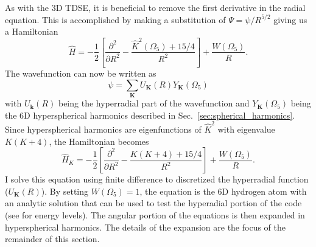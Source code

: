 As with the 3D TDSE, it is beneficial to remove the first derivative in the radial equation. This is accomplished by making a substitution of $\Psi = \psi/R^{5/2}$ giving us a Hamiltonian
\begin{equation}
   \hat{H} = -\frac{1}{2} \left[\frac{\partial^2}{\partial R^2} - \frac{\hat{K}^2(\Omega_5)+15/4}{R^2}\right] + \frac{W(\Omega_5)}{R}.
\end{equation}
The wavefunction can now be written as
\begin{equation}
    \psi = \sum\limits_{\mathbf{K}} U_{\mathbf{K}}(R) Y_{\mathbf{K}}(\Omega_5)
\end{equation}
with $U_{\mathbf{k}}(R)$ being the hyperradial part of the wavefunction and $Y_{\mathbf{K}}(\Omega_5)$ being the 6D hyperspherical harmonics described in Sec.~\ref{sec:spherical_harmonics}. Since hyperspherical harmonics are eigenfunctions of $\hat{K}^2$ with eigenvalue $K(K+4)$, the Hamiltonian becomes
\begin{equation}
   \hat{H}_{K} = -\frac{1}{2} \left[\frac{\partial^2}{\partial R^2} - \frac{K(K+4)+15/4}{R^2}\right] + \frac{W(\Omega_5)}{R}.
\end{equation}
I solve this equation using finite difference to discretized the hyperradial function ($U_{\mathbf{K}}(R)$). By setting $W(\Omega_5)=1$, the equation is the 6D hydrogen atom with an analytic solution that can be used to test the hyperadial portion of the code (see \cite{S_revik_2005} for energy levels). The angular portion of the equations is then expanded in hyperspherical harmonics. The details of the expansion are the focus of the remainder of this section.

